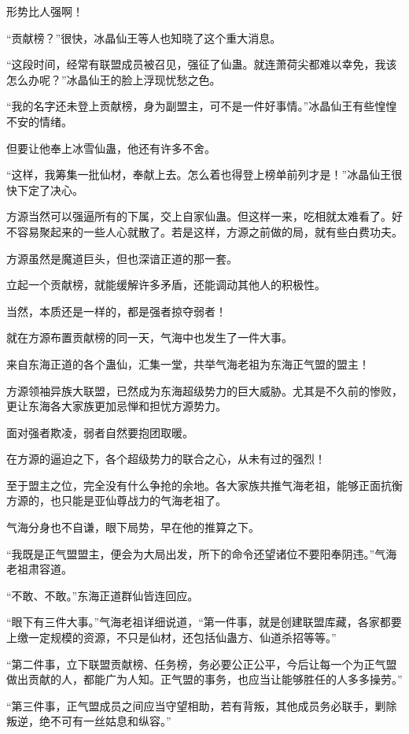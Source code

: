 \begin{this_body}
形势比人强啊！

“贡献榜？”很快，冰晶仙王等人也知晓了这个重大消息。

“这段时间，经常有联盟成员被召见，强征了仙蛊。就连萧荷尖都难以幸免，我该怎么办呢？”冰晶仙王的脸上浮现忧愁之色。

“我的名字还未登上贡献榜，身为副盟主，可不是一件好事情。”冰晶仙王有些惶惶不安的情绪。

但要让他奉上冰雪仙蛊，他还有许多不舍。

“这样，我筹集一批仙材，奉献上去。怎么着也得登上榜单前列才是！”冰晶仙王很快下定了决心。

方源当然可以强逼所有的下属，交上自家仙蛊。但这样一来，吃相就太难看了。好不容易聚起来的一些人心就散了。若是这样，方源之前做的局，就有些白费功夫。

方源虽然是魔道巨头，但也深谙正道的那一套。

立起一个贡献榜，就能缓解许多矛盾，还能调动其他人的积极性。

当然，本质还是一样的，都是强者掠夺弱者！

就在方源布置贡献榜的同一天，气海中也发生了一件大事。

来自东海正道的各个蛊仙，汇集一堂，共举气海老祖为东海正气盟的盟主！

方源领袖异族大联盟，已然成为东海超级势力的巨大威胁。尤其是不久前的惨败，更让东海各大家族更加忌惮和担忧方源势力。

面对强者欺凌，弱者自然要抱团取暖。

在方源的逼迫之下，各个超级势力的联合之心，从未有过的强烈！

至于盟主之位，完全没有什么争抢的余地。各大家族共推气海老祖，能够正面抗衡方源的，也只能是亚仙尊战力的气海老祖了。

气海分身也不自谦，眼下局势，早在他的推算之下。

“我既是正气盟盟主，便会为大局出发，所下的命令还望诸位不要阳奉阴违。”气海老祖肃容道。

“不敢、不敢。”东海正道群仙皆连回应。

“眼下有三件大事。”气海老祖详细说道，“第一件事，就是创建联盟库藏，各家都要上缴一定规模的资源，不只是仙材，还包括仙蛊方、仙道杀招等等。”

“第二件事，立下联盟贡献榜、任务榜，务必要公正公平，今后让每一个为正气盟做出贡献的人，都能广为人知。正气盟的事务，也应当让能够胜任的人多多操劳。”

“第三件事，正气盟成员之间应当守望相助，若有背叛，其他成员务必联手，剿除叛逆，绝不可有一丝姑息和纵容。”


\end{this_body}
